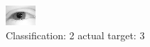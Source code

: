 \begin{figure}[h!]
\begin{center}
\includegraphics[width=0.60\columnwidth]{figures/ID2400_class_2_target_3.png}
\end{center}
\caption{ Classification: 2 actual target: 3}
\label{fig:ID2400_class_2_target_3}
\end{figure}
